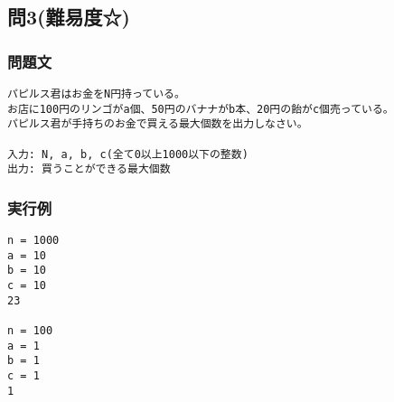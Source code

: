 \subsection{問3(難易度☆)}
\subsubsection{問題文}
\begin{verbatim}
パピルス君はお金をN円持っている。
お店に100円のリンゴがa個、50円のバナナがb本、20円の飴がc個売っている。
パピルス君が手持ちのお金で買える最大個数を出力しなさい。

入力: N, a, b, c(全て0以上1000以下の整数)
出力: 買うことができる最大個数
\end{verbatim}

\subsubsection{実行例}
\begin{verbatim}
n = 1000
a = 10
b = 10
c = 10
23

n = 100
a = 1
b = 1
c = 1
1
\end{verbatim}
